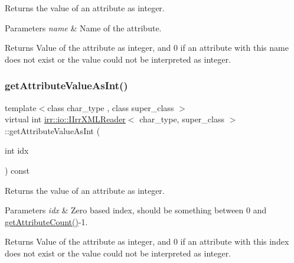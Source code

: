 Returns the value of an attribute as integer. 


\begin{DoxyParams}{Parameters}
{\em name} & Name of the attribute. \\
\hline
\end{DoxyParams}
\begin{DoxyReturn}{Returns}
Value of the attribute as integer, and 0 if an attribute with this name does not exist or the value could not be interpreted as integer. 
\end{DoxyReturn}
\mbox{\label{classirr_1_1io_1_1IIrrXMLReader_a8f2d57c9f358b9683fb177f440661426}} 
\subsubsection{\texorpdfstring{get\+Attribute\+Value\+As\+Int()}{getAttributeValueAsInt()}\hspace{0.1cm}{\footnotesize\ttfamily [3/4]}}
{\footnotesize\ttfamily template$<$class char\+\_\+type , class super\+\_\+class $>$ \\
virtual int \hyperlink{classirr_1_1io_1_1IIrrXMLReader}{irr\+::io\+::\+I\+Irr\+X\+M\+L\+Reader}$<$ char\+\_\+type, super\+\_\+class $>$\+::get\+Attribute\+Value\+As\+Int (\begin{DoxyParamCaption}\item[{int}]{idx }\end{DoxyParamCaption}) const\hspace{0.3cm}{\ttfamily [pure virtual]}}



Returns the value of an attribute as integer. 


\begin{DoxyParams}{Parameters}
{\em idx} & Zero based index, should be something between 0 and \hyperlink{classirr_1_1io_1_1IIrrXMLReader_a8f85253d2efb15061facdb9571b9c549}{get\+Attribute\+Count()}-\/1. \\
\hline
\end{DoxyParams}
\begin{DoxyReturn}{Returns}
Value of the attribute as integer, and 0 if an attribute with this index does not exist or the value could not be interpreted as integer. 
\end{DoxyReturn}
\mbox{\label{classirr_1_1io_1_1IIrrXMLReader_a8f2d57c9f358b9683fb177f440661426}} 
